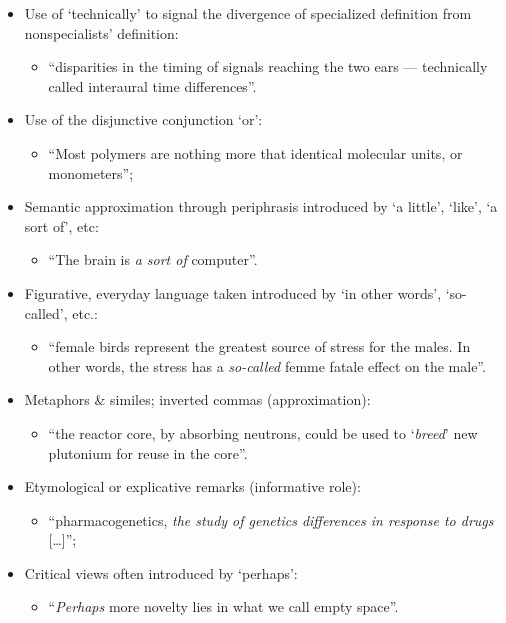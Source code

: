 \begin{itemize}
\item Use of ‘technically’ to signal the divergence of specialized definition from nonspecialists’ definition: 

\begin{itemize}
\item “disparities in the timing of signals reaching the two ears — technically called interaural time differences”.
\end{itemize}

\item Use of the disjunctive conjunction ‘or’:

\begin{itemize}
\item “Most polymers are nothing more that identical molecular units, or monometers”;
\end{itemize}

\item Semantic approximation through periphrasis introduced by ‘a little’, ‘like’, ‘a sort of’, etc:

\begin{itemize}
\item “The brain is \textit{a sort of} computer”. 
\end{itemize}

\item Figurative, everyday language taken introduced by ‘in other words’, ‘so-called’,  etc.:

\begin{itemize}
\item “female birds represent the greatest source of stress for the males. In other words, the stress has a \textit{so-called} femme fatale effect on the male”.
\end{itemize}

\item Metaphors \& similes; inverted commas (approximation):

\begin{itemize}
\item “the reactor core, by absorbing neutrons, could be used to ‘\textit{breed}’ new plutonium for reuse in the core”.
\end{itemize}

\item Etymological or explicative remarks (informative role):

\begin{itemize}
\item “pharmacogenetics, \textit{the study of genetics differences in response to drugs} […]”;
\end{itemize} 

\item Critical views often introduced by ‘perhaps’:

\begin{itemize}
\item “\textit{Perhaps} more novelty lies in what we call empty space”. 
\end{itemize}

\end{itemize}

